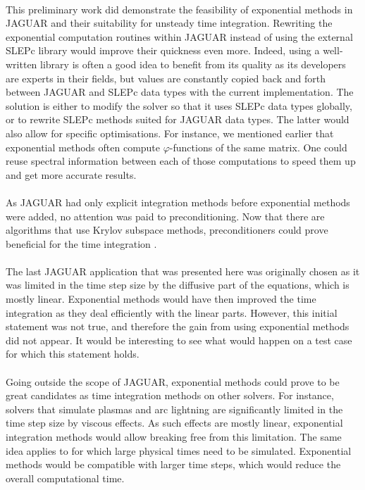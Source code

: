     \paragraph{}
    This preliminary work did demonstrate the feasibility of exponential methods in JAGUAR and their suitability for unsteady time integration.
    Rewriting the exponential computation routines within JAGUAR instead of using the external SLEPc library would improve their quickness even more.
    Indeed, using a well-written library is often a good idea to benefit from its quality as its developers are experts in their fields, but values are constantly copied back and forth between JAGUAR and SLEPc data types with the current implementation.
    The solution is either to modify the solver so that it uses SLEPc data types globally, or to rewrite SLEPc methods suited for JAGUAR data types.
    The latter would also allow for specific optimisations.
    For instance, we mentioned earlier that exponential methods often compute $\varphi$-functions of the same matrix.
    One could reuse spectral information between each of those computations to speed them up and get more accurate results.

    \paragraph{}
    As JAGUAR had only explicit integration methods before exponential methods were added, no attention was paid to preconditioning.
    Now that there are algorithms that use Krylov subspace methods, preconditioners could prove beneficial for the time integration \cite{CastilloSaad1997}.

    \paragraph{}
    The last JAGUAR application that was presented here was originally chosen as it was limited in the time step size by the diffusive part of the equations, which is mostly linear.
    Exponential methods would have then improved the time integration as they deal efficiently with the linear parts.
    However, this initial statement was not true, and therefore the gain from using exponential methods did not appear.
    It would be interesting to see what would happen on a test case for which this statement holds.

    \paragraph{}
    Going outside the scope of JAGUAR, exponential methods could prove to be great candidates as time integration methods on other solvers.
    For instance, solvers that simulate plasmas and arc lightning are significantly limited in the time step size by viscous effects.
    As such effects are mostly linear, exponential integration methods would allow breaking free from this limitation.
    The same idea applies to  for which large physical times need to be simulated.
    Exponential methods would be compatible with larger time steps, which would reduce the overall computational time.

